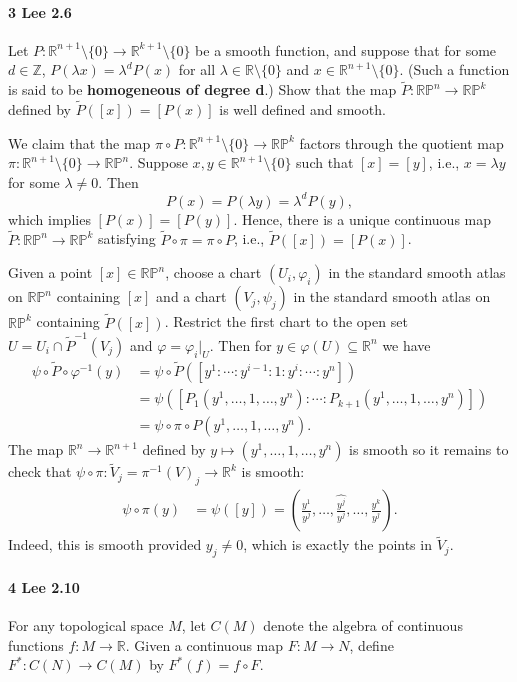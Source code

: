 \documentclass[12pt]{article}
\newlength{\myparskip}
\newenvironment{fullbox}{\begin{lrbox}{\savefullbox}\begin{minipage}{\dimexpr\textwidth-2\fboxsep\relax}\setlength{\parskip}{\myparskip}}{\end{minipage}\end{lrbox}\framebox[\textwidth]{\usebox{\savefullbox}}}
\newenvironment{pbox}[1][]{\begin{fullbox}\def\temp{#1}\ifx\temp\empty\else\paragraph{#1}\phantom{}\fi}{\end{fullbox}}
\theoremstyle{definition}
\newcommand{\Z}{\mathbb{Z}}
\newcommand{\R}{\mathbb{R}}
\renewcommand{\P}{\mathbb{P}}
\renewcommand{\phi}{\varphi}
\newcommand{\<}{\langle}
\renewcommand{\>}{\rangle}
\newcommand{\seq}{\subseteq}
\renewcommand{\tilde}{\widetilde}
\renewcommand{\hat}{\widehat}
\begin{document}
\newpage
\begin{pbox}[3 Lee 2.6]
    Let $P: \R^{n+1}\setminus \{0\} \to \R^{k+1}\setminus \{0\}$ be a smooth function, and suppose that for some $d\in \Z$, $P(\lambda x) = \lambda^d P(x)$ for all $\lambda \in \R \setminus \{0\}$ and $x\in \R^{n+1} \setminus \{0\}$. (Such a function is said to be \textbf{homogeneous of degree d}.) Show that the map $\tilde{P}: \R\P^n \to \R\P^k$ defined by $\tilde{P}([x]) = [P(x)]$ is well defined and smooth.
\end{pbox}

We claim that the map $\pi \circ P : \R^{n+1} \setminus \{0\} \to \R\P^k$ factors through the quotient map $\pi : \R^{n+1} \setminus \{0\} \to \R\P^n$.
Suppose $x, y \in \R^{n+1} \setminus \{0\}$ such that $[x] = [y]$, i.e., $x = \lambda y$ for some $\lambda \ne 0$.
Then
\[
    P(x)
        = P(\lambda y)
        = \lambda^dP(y),
\]
which implies $[P(x)] = [P(y)]$.
Hence, there is a unique continuous map $\tilde{P} : \R\P^n \to \R\P^k$ satisfying $\tilde{P} \circ \pi = \pi \circ P$, i.e., $\tilde{P}([x]) = [P(x)]$.

Given a point $[x] \in \R\P^n$, choose a chart $(U_i, \phi_i)$ in the standard smooth atlas on $\R\P^n$ containing $[x]$ and a chart $(V_j, \psi_j)$ in the standard smooth atlas on $\R\P^k$ containing $\tilde{P}([x])$.
Restrict the first chart to the open set $U = U_i \cap \tilde{P}^{-1}(V_j)$ and $\phi = \phi_i|_U$.
Then for $y \in \phi(U) \seq \R^n$ we have
\begin{align*}
    \psi \circ \tilde{P} \circ \phi^{-1}(y)
        &= \psi \circ \tilde{P}([y^1 : \cdots : y^{i-1} : 1 : y^i : \cdots : y^n]) \\
        &= \psi([P_1(y^1, \dots, 1, \dots, y^n) : \cdots : P_{k+1}(y^1, \dots, 1, \dots, y^n)]) \\
        &= \psi \circ \pi \circ P(y^1, \dots, 1, \dots, y^n).
\end{align*}
The map $\R^n \to \R^{n+1}$ defined by $y \mapsto (y^1, \dots, 1, \dots, y^n)$ is smooth so it remains to check that $\psi \circ \pi : \tilde{V}_j = \pi^{-1}(V)_j \to \R^k$ is smooth:
\begin{align*}
    \psi \circ \pi(y)
        &= \psi([y])
        = \textstyle\left(\frac{y^1}{y^j}, \dots, \hat{\frac{y^j}{y^j}}, \dots, \frac{y^k}{y^j}\right).
\end{align*}
Indeed, this is smooth provided $y_j \ne 0$, which is exactly the points in $\tilde{V}_j$.




\newpage
\begin{pbox}[4 Lee 2.10]
    For any topological space $M$, let $C(M)$ denote the algebra of continuous functions $f:M\to \R$. Given a continuous map $F: M\to N$, define $F^*: C(N) \to C(M)$ by $F^*(f) = f\circ F$.
\end{pbox}
\end{document}
